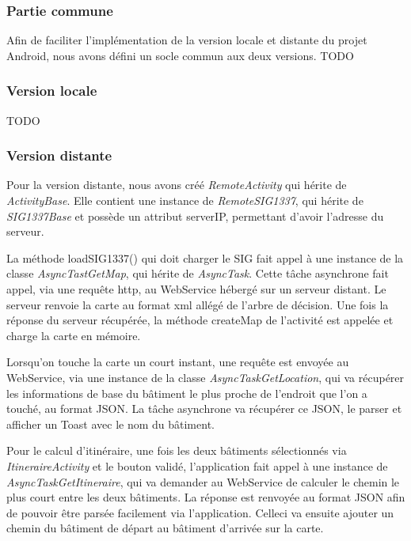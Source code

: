 
\subsubsection{Partie commune}

Afin de faciliter l'implémentation de la version locale et distante du projet Android,
nous avons défini un socle commun aux deux versions.
TODO

\subsubsection{Version locale}

TODO

\subsubsection{Version distante}

Pour la version distante, nous avons créé \textit{RemoteActivity} qui hérite de \textit{ActivityBase}.
Elle contient une instance de \textit{RemoteSIG1337}, qui hérite de \textit{SIG1337Base} et possède un attribut serverIP,
permettant d'avoir l'adresse du serveur.

La méthode loadSIG1337() qui doit charger le SIG fait appel à une instance de la classe \textit{AsyncTastGetMap},
qui hérite de \textit{AsyncTask}.
Cette tâche asynchrone fait appel, via une requête http, au WebService hébergé sur un serveur distant.
Le serveur renvoie la carte au format xml allégé de l'arbre de décision.
Une fois la réponse du serveur récupérée, la méthode createMap de l'activité est appelée et charge la carte en mémoire.

Lorsqu'on touche la carte un court instant, une requête est envoyée au WebService,
via une instance de la classe \textit{AsyncTaskGetLocation},
qui va récupérer les informations de base du bâtiment le plus proche de l'endroit que l'on a touché, au format JSON.
La tâche asynchrone va récupérer ce JSON, le parser et afficher un Toast avec le nom du bâtiment.

Pour le calcul d'itinéraire, une fois les deux bâtiments sélectionnés via \textit{ItineraireActivity} et le bouton validé,
l'application fait appel à une instance de \textit{AsyncTaskGetItineraire},
qui va demander au WebService de calculer le chemin le plus court entre les deux bâtiments.
La réponse est renvoyée au format JSON afin de pouvoir être parsée facilement via l'application.
Celle\-ci va ensuite ajouter un chemin du bâtiment de départ au bâtiment d'arrivée sur la carte.


